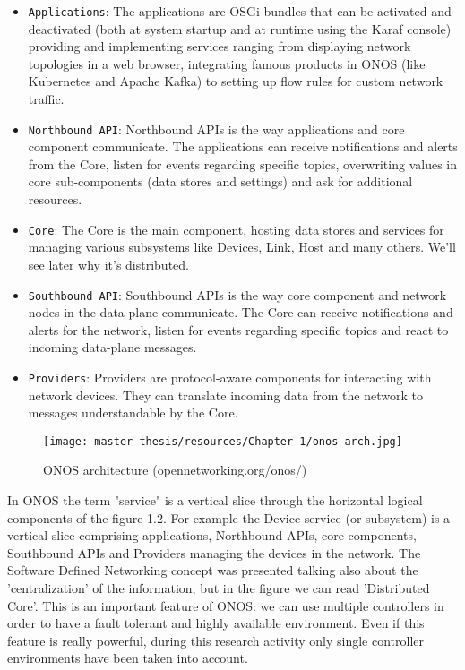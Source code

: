 \documentclass[a4paper,10pt]{memoir}
\begin{document}
\begin{itemize}
  \item \texttt{Applications}: The applications are OSGi bundles that can be activated and deactivated (both at system startup and at runtime using the Karaf console) providing and implementing services ranging from displaying network topologies in a web browser, integrating famous products in ONOS (like Kubernetes and Apache Kafka) to setting up flow rules for custom network traffic.
  \item \texttt{Northbound API}: Northbound APIs is the way applications and core component communicate. The applications can receive notifications and alerts from the Core, listen for events regarding specific topics, overwriting values in core sub-components (data stores and settings) and ask for additional resources.
  \item \texttt{Core}: The Core is the main component, hosting data stores and services for managing various subsystems like Devices, Link, Host and many others. We'll see later why it's distributed. 
  \item \texttt{Southbound API}: Southbound APIs is the way core component and network nodes in the data-plane communicate. The Core can receive notifications and alerts for the network, listen for events regarding specific topics and react to incoming data-plane messages.
  \item \texttt{Providers}: Providers are protocol-aware components for interacting with network devices. They can translate incoming data from the network to messages understandable by the Core. 
\end{itemize}

\begin{figure}[t]
\caption{ONOS architecture (opennetworking.org/onos/)}
\label{fig:onos-arch}
\texttt{[image: master-thesis/resources/Chapter-1/onos-arch.jpg]}
\centering
\end{figure}

In ONOS the term "service" is a vertical slice through the horizontal logical components of the figure 1.2. For example the Device service (or subsystem) is a vertical slice comprising applications, Northbound APIs, core components, Southbound APIs and Providers managing the devices in the network. The Software Defined Networking concept was presented talking also about the 'centralization' of the information, but in the figure we can read 'Distributed Core'. This is an important feature of ONOS: we can use multiple controllers in order to have a fault tolerant and highly available environment. Even if this feature is really powerful, during this research activity only single controller environments have been taken into account. 
\end{document}
